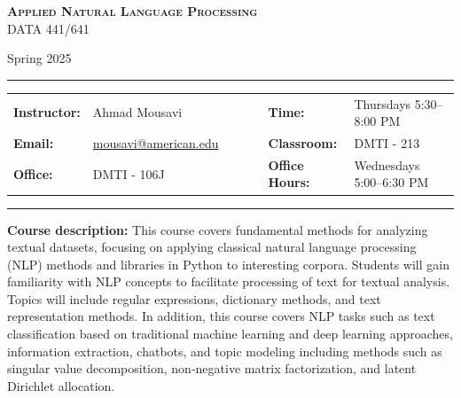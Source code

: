 \documentclass[11pt, a4paper]{article}
\begin{document}
\begin{center}
{\Large \textsc{\bf Applied Natural Language Processing}}\\ DATA 441/641
\end{center}
\begin{center}
Spring 2025
\end{center}
\vspace{-1cm}
\begin{center}
\rule{6in}{0.4pt}
\begin{minipage}[t]{.865\textwidth}
\begin{tabular}{llcccll}
\textbf{Instructor:} & Ahmad Mousavi & & &  & \textbf{Time:} & Thursdays 5:30--8:00 PM \\
\textbf{Email:} &  \href{mailto:mousavi@american.edu}{mousavi@american.edu} & & & & \textbf{Classroom:} &
DMTI - 213\\
\textbf{Office:} &  DMTI - 106J & & & & \textbf{Office Hours:} & Wednesdays 5:00--6:30 PM \\
\end{tabular}
\end{minipage}
\rule{6in}{0.4pt}
\end{center}

\setlength{\unitlength}{1in}
\renewcommand{\arraystretch}{2}

\noindent\textbf{Course description:} This course covers fundamental methods for analyzing textual datasets, focusing on applying classical natural language processing (NLP) methods and libraries in Python to interesting corpora. Students will gain familiarity with NLP concepts to facilitate processing of text for textual analysis. Topics will include regular expressions, dictionary methods, and text representation methods. In addition, this course covers NLP tasks such as text classification based on traditional machine learning and deep learning approaches, information extraction, chatbots, and topic modeling including methods such as singular value decomposition, non-negative matrix factorization, and latent Dirichlet allocation.
\end{document}
